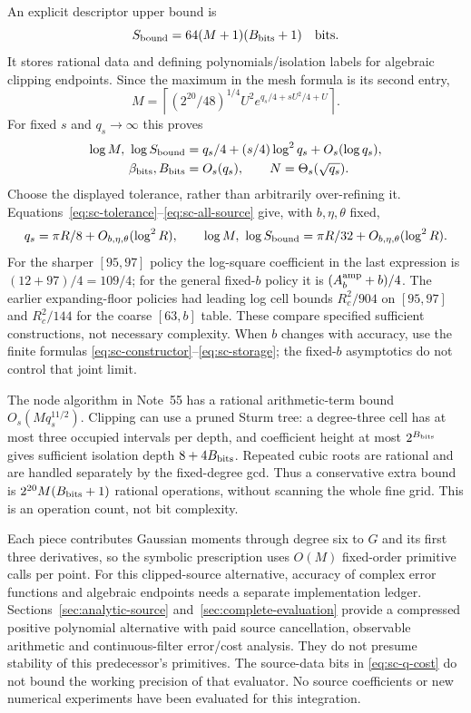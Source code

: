 An explicit descriptor upper bound is
\begin{equation}
 S_{\rm bound}=64(M+1)(B_{\rm bits}+1)\quad\hbox{bits}.
 \label{eq:sc-storage}
\end{equation}
It stores rational data and defining polynomials/isolation labels for
algebraic clipping endpoints. Since the maximum in the mesh formula is
its second entry,
\[
 M=\left\lceil(2^{20}/48)^{1/4}U^2
                   e^{q_s/4+sU^2/4+U}\right\rceil.
\]
For fixed $s$ and $q_s\to\infty$ this proves
\begin{align}
 \log M,\ \log S_{\rm bound}
   &=q_s/4+(s/4)\log^2 q_s+O_s(\log q_s),\notag\\
 \beta_{\rm bits},B_{\rm bits}&=O_s(q_s),\qquad N=\Theta_s(\sqrt{q_s}).
 \label{eq:sc-q-cost}
\end{align}
Choose the displayed tolerance, rather than arbitrarily over-refining it.
Equations~\eqref{eq:sc-tolerance}--\eqref{eq:sc-all-source} give, with
$b,\eta,\theta$ fixed,
\begin{equation}
 q_s=\pi R/8+O_{b,\eta,\theta}(\log^2R),\qquad
 \log M,\ \log S_{\rm bound}
       =\pi R/32+O_{b,\eta,\theta}(\log^2R).
 \label{eq:sc-radius-cost}
\end{equation}
For the sharper $[95,97]$ policy the log-square coefficient in the last
expression is $(12+97)/4=109/4$; for the general fixed-$b$ policy it is
$(A_b^{\rm amp}+b)/4$. The earlier expanding-floor policies had leading
log cell bounds $R_c^2/904$ on $[95,97]$ and $R_c^2/144$ for the
coarse $[63,b]$ table. These compare specified sufficient constructions,
not necessary complexity. When $b$ changes with accuracy, use the finite
formulas \eqref{eq:sc-constructor}--\eqref{eq:sc-storage}; the fixed-$b$
asymptotics do not control that joint limit.

The node algorithm in Note~55 has a rational arithmetic-term bound
$O_s(Mq_s^{11/2})$. Clipping can use a pruned Sturm tree: a degree-three
cell has at most three occupied intervals per depth, and coefficient
height at most $2^{B_{\rm bits}}$ gives sufficient isolation depth
$8+4B_{\rm bits}$. Repeated cubic roots are rational and are handled
separately by the fixed-degree gcd. Thus a conservative extra bound is
$2^{20}M(B_{\rm bits}+1)$ rational operations, without scanning the
whole fine grid. This is an operation count, not bit complexity.

Each piece contributes Gaussian moments through degree six to $G$ and
its first three derivatives, so the symbolic prescription uses $O(M)$
fixed-order primitive calls per point. For this clipped-source alternative, accuracy of complex error
functions and algebraic endpoints needs a separate implementation ledger.
Sections~\ref{sec:analytic-source} and~\ref{sec:complete-evaluation}
provide a compressed positive polynomial alternative with paid source
cancellation, observable arithmetic and continuous-filter error/cost
analysis. They do not presume stability of this predecessor's primitives.
The source-data bits in \eqref{eq:sc-q-cost} do not bound the working
precision of that evaluator. No source coefficients or new numerical
experiments have been evaluated for this integration.
